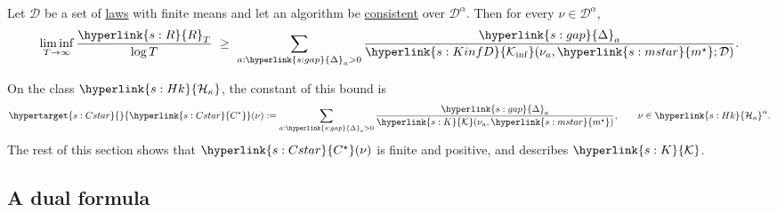 \documentclass[11pt]{article}
\newcommand{\dt}[1]{\hypertarget{#1}{}}
\newcommand{\sy}[2]{{\hyperlink{#1}{#2}}}
\newcommand{\term}[2]{\hyperlink{#1}{#2}}
\newcommand{\mstar}{\sy{s:mstar}{m^{\star}}}
\newcommand{\gap}{\sy{s:gap}{\Delta}}
\newcommand{\Kinf}{\sy{s:KinfD}{\mathcal{K}_{\inf}}}
\newcommand{\Hk}{\sy{s:Hk}{\mathcal{H}_{\kappa}}}
\newcommand{\Kc}{\sy{s:K}{\mathcal{K}}}
\newcommand{\Reg}{\sy{s:R}{R}}
\newcommand{\Cst}{\sy{s:Cstar}{C^{\star}}}
\begin{document}
\begin{theorem}\label{cite:LS-16.2}
Let $\mathcal D$ be a set of \term{w:law}{laws} with finite means and let an algorithm be \term{w:consistent}{consistent} over $\mathcal D^\alpha$. Then for
every $\nu\in\mathcal D^\alpha$,
\begin{equation*}
  \liminf_{T\to\infty}\frac{\Reg_T}{\log T}\ \ge\ \sum_{a:\gap_a>0}\frac{\gap_a}{\Kinf(\nu_a,\mstar;\mathcal D)}.
\end{equation*}
\end{theorem}

On the class $\Hk$, the constant of this bound is
\begin{equation}\label{eq:cstar}
  \dt{s:Cstar}\Cst(\nu):=\sum_{a:\gap_a>0}\frac{\gap_a}{\Kc(\nu_a,\mstar)},\qquad \nu\in\Hk^\alpha.
\end{equation}
The rest of this section shows that $\Cst(\nu)$ is finite and positive, and describes $\Kc$.

\subsection{A dual formula}
\end{document}
